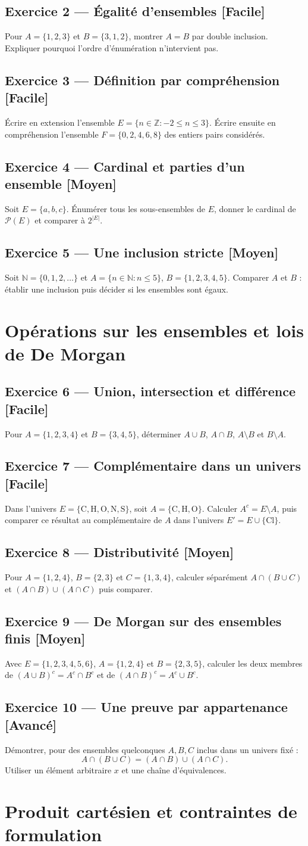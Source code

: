 \documentclass[11pt,a4paper,oneside]{article}
\newcommand{\exo}[3]{%
  \Needspace{6\baselineskip}%
  \subsection*{Exercice #1 --- #3 \hfill
  {\normalfont\footnotesize\color{GrisTexte}[#2]}}}
\begin{document}
\exo{2}{Facile}{Égalité d'ensembles}
Pour $A=\{1,2,3\}$ et $B=\{3,1,2\}$, montrer $A=B$ par double inclusion. Expliquer pourquoi l'ordre d'énumération n'intervient pas.

\exo{3}{Facile}{Définition par compréhension}
Écrire en extension l'ensemble $E=\{n\in\mathbb Z:-2\le n\le3\}$.
Écrire ensuite en compréhension l'ensemble $F=\{0,2,4,6,8\}$ des entiers pairs considérés.

\exo{4}{Moyen}{Cardinal et parties d'un ensemble}
Soit $E=\{a,b,c\}$. Énumérer tous les sous-ensembles de $E$, donner le cardinal de $\mathcal P(E)$ et comparer à $2^{|E|}$.

\exo{5}{Moyen}{Une inclusion stricte}
Soit $\mathbb N=\{0,1,2,\ldots\}$ et
$A=\{n\in\mathbb N:n\le5\}$, $B=\{1,2,3,4,5\}$.
Comparer $A$ et $B$ : établir une inclusion puis décider si les ensembles sont égaux.

\section{Opérations sur les ensembles et lois de De Morgan}

\exo{6}{Facile}{Union, intersection et différence}
Pour $A=\{1,2,3,4\}$ et $B=\{3,4,5\}$, déterminer
$A\cup B$, $A\cap B$, $A\setminus B$ et $B\setminus A$.

\exo{7}{Facile}{Complémentaire dans un univers}
Dans l'univers $E=\{\mathrm C,\mathrm H,\mathrm O,\mathrm N,\mathrm S\}$,
soit $A=\{\mathrm C,\mathrm H,\mathrm O\}$.
Calculer $A^c=E\setminus A$, puis comparer ce résultat au complémentaire de $A$ dans l'univers $E'=E\cup\{\mathrm{Cl}\}$.

\exo{8}{Moyen}{Distributivité}
Pour $A=\{1,2,4\}$, $B=\{2,3\}$ et $C=\{1,3,4\}$,
calculer séparément $A\cap(B\cup C)$ et $(A\cap B)\cup(A\cap C)$ puis comparer.

\exo{9}{Moyen}{De Morgan sur des ensembles finis}
Avec $E=\{1,2,3,4,5,6\}$, $A=\{1,2,4\}$ et $B=\{2,3,5\}$, calculer les deux membres de
$(A\cup B)^c=A^c\cap B^c$ et de
$(A\cap B)^c=A^c\cup B^c$.

\exo{10}{Avancé}{Une preuve par appartenance}
Démontrer, pour des ensembles quelconques $A,B,C$ inclus dans un univers fixé :
\[
A\cap(B\cup C)=(A\cap B)\cup(A\cap C).
\]
Utiliser un élément arbitraire $x$ et une chaîne d'équivalences.

\section{Produit cartésien et contraintes de formulation}
\end{document}
